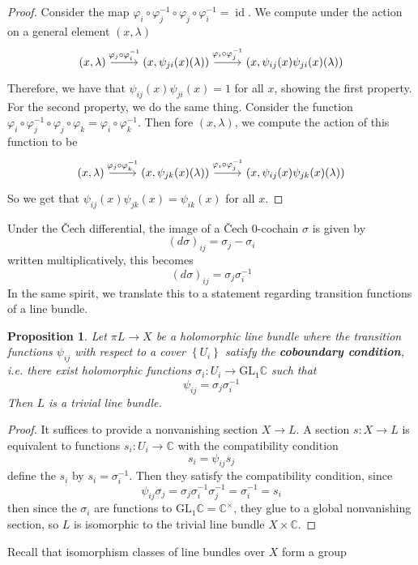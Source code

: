 \documentclass[psamsfonts, 12pt]{amsart}
\newtheorem{prop}[thm]{Proposition}
\theoremstyle{definition}
\theoremstyle{remark}
\newcommand{\ib}[1]{\textbf{\textit{#1}}}
\newcommand{\C}{\mathbb{C}}
\newcommand{\GL}{\mathrm{GL}}
\newcommand{\inv}{^{-1}}
\newcommand{\set}[1]{\left\lbrace #1 \right\rbrace}
\DeclareMathOperator{\id}{id}
\begin{document}
\begin{proof}
Consider the map $\varphi_i\circ\varphi_j\inv\circ\varphi_j\circ\varphi_i\inv = \id$.
We compute under the action on a general element $(x,\lambda)$
\[\begin{tikzcd}
(x,\lambda) \ar[r, "\varphi_j\circ\varphi_i\inv"] & (x,\psi_{ji}(x)(\lambda))
\ar[r, "\varphi_i\circ\varphi_j\inv"] & (x,\psi_{ij}(x)\psi_{ji}(x)(\lambda))
\end{tikzcd}\]
Therefore, we have that $\psi_{ij}(x)\psi_{ji}(x) = 1$ for all $x$, showing the
first property. For the second property, we do the same thing. Consider
the function
$\varphi_i\circ\varphi_j\inv\circ\varphi_j\circ\varphi_k = \varphi_i\circ\varphi_k\inv$.
Then fore $(x,\lambda)$, we compute the action of this function to be
\[\begin{tikzcd}
(x,\lambda) \ar[r, "\varphi_j\circ\varphi_k\inv"] & (x,\psi_{jk}(x)(\lambda))
\ar[r, "\varphi_i\circ\varphi_j\inv"] & (x,\psi_{ij}(x)\psi_{jk}(x)(\lambda))
\end{tikzcd}\]
So we get that $\psi_{ij}(x)\psi_{jk}(x) = \psi_{ik}(x)$ for all $x$.
\end{proof}
%
Under the \v{C}ech differential, the image of a \v{C}ech $0$-cochain $\sigma$ is given
by
\[
(d\sigma)_{ij} = \sigma_j - \sigma_i
\]
written multiplicatively, this becomes
\[
(d\sigma)_{ij} = \sigma_j\sigma_i\inv
\]
In the same spirit, we translate this to a statement regarding transition functions
of a line bundle.
%
\begin{prop}
Let $\pi L \to X$ be a holomorphic line bundle where the transition functions
$\psi_{ij}$ with respect to a cover $\set{U_i}$ satisfy the \ib{coboundary condition},
i.e. there exist holomorphic functions $\sigma_i : U_i \to \GL_1\C$ such that
\[
\psi_{ij} = \sigma_j\sigma_i\inv
\]
Then $L$ is a trivial line bundle.
\end{prop}
%
\begin{proof}
It suffices to provide a nonvanishing section $X \to L$. A section $s : X \to L$ is
equivalent to functions $s_i : U_i \to \C$ with the compatibility condition
\[
s_i = \psi_{ij}s_j
\]
define the $s_i$ by $s_i = \sigma_i\inv$. Then they satisfy the compatibility condition,
since
\[
\psi_{ij}\sigma_j = \sigma_j\sigma_i\inv\sigma_j\inv = \sigma_i\inv = s_i
\]
then since the $\sigma_i$ are functions to $\GL_1\C = \C^\times$, they glue to
a global nonvanishing section, so $L$ is isomorphic to the trivial line bundle
$X \times \C$.
\end{proof}
%
Recall that isomorphism classes of line bundles over $X$ form a group
\end{document}
